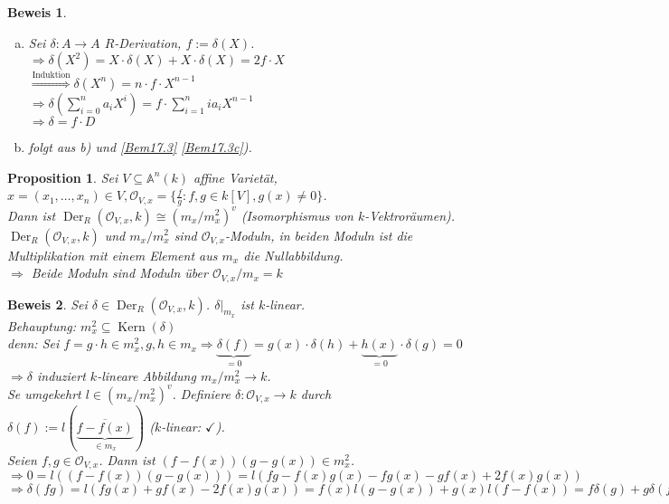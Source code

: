 \documentclass[a4paper,12pt]{report}
\theoremstyle{break}
\newtheorem{Prop}[Def]{Proposition}
\theoremstyle{nonumberbreak}
\newtheorem{Bew}{Beweis}
\theoremstyle{nonumberplain}
\DeclareMathOperator{\Kern}{Kern}
\DeclareMathOperator{\Der}{Der}
\newcommand{\A}{\mathbb{A}}
\newcommand{\calO}{\mathcal{O}}
\begin{document}
\begin{Bew}\begin{enumerate}[a)]
\item
	Sei $\delta: A\to A$ $R$-Derivation, $f:=\delta(X)$.\\
	$\Rightarrow \delta(X^2) = X\cdot\delta(X)+X\cdot\delta(X)=2f\cdot X$\\
	$\overset{\text{Induktion}}{\Longrightarrow} \delta(X^n)=n\cdot f\cdot X^{n-1}$\\
	$\Rightarrow \delta(\sum\limits_{i=0}^na_iX^i) = f\cdot \sum\limits_{i=1}^nia_iX^{n-1}$\\
	$\Rightarrow \delta=f\cdot D$
\item[c)]
	folgt aus b) und \ref{Bem17.3} \ref{Bem17.3c}).
\end{enumerate}\end{Bew}

\begin{Prop}\label{prop17.5}
Sei $V\subseteq\A^n(k)$ affine Variet\"at, $x=(x_1,\ldots ,x_n)\in V, \calO_{V,x}=\{\frac{f}{g}: f,g\in k[V], g(x)\ne 0\}$.\\
Dann ist $\Der_R(\calO_{V,x},k)\cong(m_x/m_x^2)^v$ (Isomorphismus von $k$-Vektror\"aumen).\\
$\Der_R(\calO_{V,x},k)$ und $m_x/m_x^2$ sind $\calO_{V,x}$-Moduln, in beiden Moduln ist die Multiplikation mit einem Element aus $m_x$ die Nullabbildung.\\
$\Rightarrow $ Beide Moduln sind Moduln \"uber $\calO_{V,x}/m_x=k$
\end{Prop}

\begin{Bew}
Sei $\delta \in \Der_R(\calO_{V,x},k)$. $\delta|_{m_x}$ ist $k$-linear.\\
\emph{Behauptung:} $m_x^2\subseteq\Kern(\delta)$\\
\emph{denn:} Sei $f=g\cdot h\in m_x^2, g, h\in m_x \Rightarrow \underbrace{\delta(f)}_{=0} = g(x)\cdot\delta(h)+\underbrace{h(x)}_{=0}\cdot \delta(g)=0$\\
$\Rightarrow \delta$ induziert $k$-lineare Abbildung $m_x/m_x^2 \to k$.\\
Se umgekehrt $l\in (m_x/m_x^2)^v$. Definiere $\delta: \calO_{V,x}\to k$ durch $\delta(f):=l(\overline{\underbrace{f-f(x)}_{\in m_x}})$ ($k$-linear: $\checkmark$).\\
Seien $f,g\in \calO_{V,x}$. Dann ist $(f-f(x))(g-g(x))\in m_x^2$.\\
$\Rightarrow 0=l((f-f(x))(g-g(x))) = l(fg-f(x)g(x)-fg(x)-gf(x)+2f(x)g(x))$\\
$\Rightarrow \delta(fg)= l(fg(x)+gf(x)-2f(x)g(x)) = f(x)l(g-g(x))+g(x)l(f-f(x)) = f\delta(g)+g\delta(f)$
\end{Bew}
\end{document}
